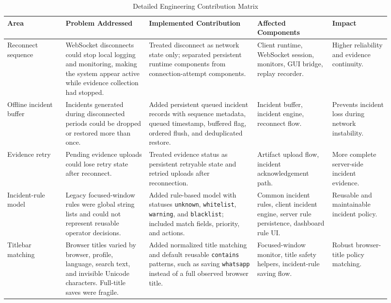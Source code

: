 \documentclass[conference]{IEEEtran}
\begin{document}
\begin{table}[htbp]
\caption{Detailed Engineering Contribution Matrix}
\centering
\begin{tabular}{P{0.14\linewidth} P{0.20\linewidth} P{0.26\linewidth} P{0.18\linewidth} P{0.14\linewidth}}
\toprule
\textbf{Area} & \textbf{Problem Addressed} & \textbf{Implemented Contribution} & \textbf{Affected Components} & \textbf{Impact} \\
\midrule
Reconnect sequence & WebSocket disconnects could stop local logging and monitoring, making the system appear active while evidence collection had stopped. & Treated disconnect as network state only; separated persistent runtime components from connection-attempt components. & Client runtime, WebSocket session, monitors, GUI bridge, replay recorder. & Higher reliability and evidence continuity. \\
\midrule
Offline incident buffer & Incidents generated during disconnected periods could be dropped or restored more than once. & Added persistent queued incident records with sequence metadata, queued timestamp, buffered flag, ordered flush, and deduplicated restore. & Incident buffer, incident engine, reconnect flow. & Prevents incident loss during network instability. \\
\midrule
Evidence retry & Pending evidence uploads could lose retry state after reconnect. & Treated evidence status as persistent retryable state and retried uploads after reconnection. & Artifact upload flow, incident acknowledgement path. & More complete server-side incident evidence. \\
\midrule
Incident-rule model & Legacy focused-window rules were global string lists and could not represent reusable operator decisions. & Added rule-based model with statuses \texttt{unknown}, \texttt{whitelist}, \texttt{warning}, and \texttt{blacklist}; included match fields, priority, and actions. & Common incident rules, client incident engine, server rule persistence, dashboard rule UI. & Reusable and maintainable incident policy. \\
\midrule
Titlebar matching & Browser titles varied by browser, profile, language, search text, and invisible Unicode characters. Full-title saves were fragile. & Added normalized title matching and default reusable \texttt{contains} patterns, such as saving \texttt{whatsapp} instead of a full observed browser title. & Focused-window monitor, title safety helpers, incident-rule saving flow. & Robust browser-title policy matching. \\

\end{tabular}
\end{table}
\end{document}
